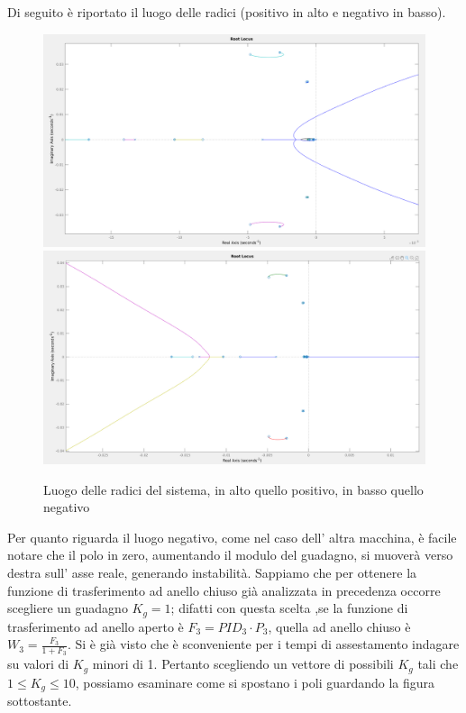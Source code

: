 \documentclass[Lau,noexaminfo]{sapthesis}
\begin{document}
	Di seguito è riportato il luogo delle radici (positivo in alto e negativo in basso).
	\begin{figure}[h]
		\centering
		\includegraphics[scale=0.255]{rlocus_F3_pos}
		\includegraphics[scale=0.255]{rlocus_F3_neg}
		\caption{Luogo delle radici del sistema, in alto quello positivo, in basso quello negativo}
	\end{figure}
	Per quanto riguarda il luogo negativo, come nel caso dell' altra macchina, è facile notare che il polo in zero, aumentando il modulo del guadagno, si muoverà verso destra sull' asse reale, generando instabilità. Sappiamo che per ottenere la funzione di trasferimento ad anello chiuso già analizzata in precedenza occorre scegliere un guadagno $K_g=1$; difatti con questa scelta ,se la funzione di trasferimento ad anello aperto è $F_3=PID_3\cdot P_3$, quella ad anello chiuso è $W_3=\frac{F_3}{1+F_3}$. Si è già visto che è sconveniente per i tempi di assestamento indagare su valori di $K_g$ minori di 1. Pertanto scegliendo un vettore di possibili $K_g$ tali che $1\le K_g \le 10$, possiamo esaminare come si spostano i poli guardando la figura sottostante.
\end{document}

